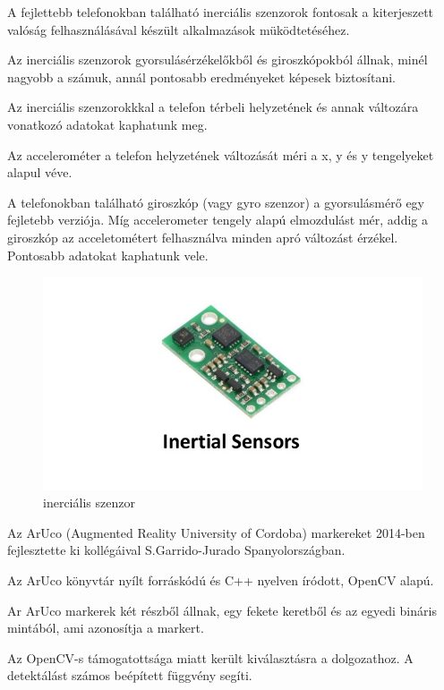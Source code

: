 
A fejlettebb telefonokban található inerciális szenzorok fontosak a kiterjeszett valóság felhasználásával készült alkalmazások müködtetéséhez.

Az inerciális szenzorok gyorsulásérzékelőkből és giroszkópokból állnak, minél nagyobb a számuk, annál pontosabb eredményeket képesek biztosítani.

Az inerciális szenzorokkkal a telefon térbeli helyzetének és annak változára vonatkozó adatokat kaphatunk meg.

Az accelerométer a telefon helyzetének változását méri a x, y és y tengelyeket alapul véve.

A telefonokban található giroszkóp (vagy gyro szenzor) a gyorsulásmérő egy fejletebb verziója.
Míg accelerometer tengely alapú elmozdulást mér, addig a giroszkóp az acceletométert felhasználva minden apró változást érzékel. Pontosabb adatokat kaphatunk vele.

\begin{figure}[htp]
    \centering
   	\includegraphics[width=3truecm, height=2truecm]{images/inertial.jpg}
	\caption{inerciális szenzor}
\end{figure}



Az ArUco (Augmented Reality University of Cordoba) markereket 2014-ben fejlesztette ki kollégáival S.Garrido-Jurado Spanyolországban.

Az ArUco könyvtár nyílt forráskódú és C++ nyelven íródott, OpenCV alapú.

Ar ArUco markerek két részből állnak, egy fekete keretből és az egyedi bináris mintából, ami azonosítja a markert.

Az OpenCV-s támogatottsága miatt került kiválasztásra a dolgozathoz. A detektálást számos beépített függvény segíti.\\

